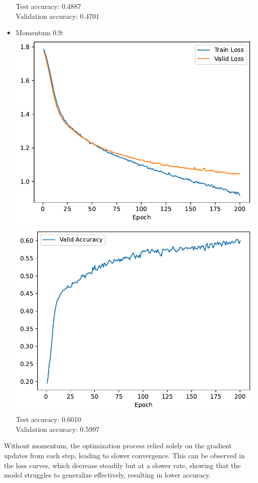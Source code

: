 \documentclass[12pt,a4paper]{article}
\begin{document}
\begin{itemize}
                Test accuracy: 0.4887 \\
                Validation accuracy: 0.4701
            \item Momentum 0.9: \\
                \includegraphics[width=\imagewidth]{q2/q2_2c_momentum_0.9-training-loss.pdf}
                \includegraphics[width=\imagewidth]{q2/q2_2c_momentum_0.9-validation-accuracy.pdf} \\
                Test accuracy: 0.6010 \\
                Validation accuracy: 0.5997
        \end{itemize}
        Without momentum, the optimization process relied solely on the gradient updates from each step, leading to slower convergence. This can be observed in the loss curves, which decrease steadily but at a slower rate, showing that the model struggles to generalize effectively, resulting in lower accuracy. \\
\end{document}
